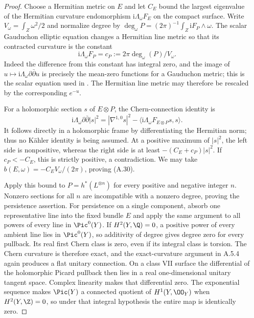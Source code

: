 \begin{proof}
Choose a Hermitian metric on $E$ and let $C_E$ bound the largest eigenvalue of the Hermitian curvature endomorphism $\mathrm i\Lambda_\omega F_E$ on the compact surface. Write $V_\omega=\int_Z\omega^2/2$ and normalize degree by
$\deg_\omega P=(2\pi)^{-1}\int_Z\mathrm iF_P\wedge\omega$.
The scalar Gauduchon elliptic equation changes a Hermitian line metric so that its contracted curvature is the constant
\[
 \mathrm i\Lambda_\omega F_P
       =c_P:=2\pi\deg_\omega(P)/V_\omega.
\]
Indeed the difference from this constant has integral zero, and the image of $u\mapsto\mathrm i\Lambda_\omega\partial\bar\partial u$ is precisely the mean-zero functions for a Gauduchon metric; this is the scalar equation used in \cite[Lemma~2.3]{Teleman2006}. The Hermitian line metric may therefore be rescaled by the corresponding $e^{-u}$.

For a holomorphic section $s$ of $E\otimes P$, the Chern-connection identity is
\[
 \mathrm i\Lambda_\omega\partial\bar\partial|s|^2
 =|\nabla^{1,0}s|^2
  -\langle\mathrm i\Lambda_\omega F_{E\otimes P}s,s\rangle.
\]
It follows directly in a holomorphic frame by differentiating the Hermitian norm; thus no Kähler identity is being assumed. At a positive maximum of $|s|^2$, the left side is nonpositive, whereas the right side is at least
$-(C_E+c_P)|s|^2$.
If $c_P<-C_E$, this is strictly positive, a contradiction. We may take $b(E,\omega)=-C_EV_\omega/(2\pi)$, proving (A.30).

Apply this bound to $P=h^*(L^{\otimes n})$ for every positive and negative integer $n$. Nonzero sections for all $n$ are incompatible with a nonzero degree, proving the persistence assertion. For persistence on a single component, absorb one representative line into the fixed bundle $E$ and apply the same argument to all powers of every line in $\Pic^0(Y)$. If $H^2(Y,\Q)=0$, a positive power of every ambient line lies in $\Pic^0(Y)$, so additivity of degree gives degree zero for every pullback. Its real first Chern class is zero, even if its integral class is torsion. The Chern curvature is therefore exact, and the exact-curvature argument in A.5.4 again produces a flat unitary connection. On a class VII surface the differential of the holomorphic Picard pullback then lies in a real one-dimensional unitary tangent space. Complex linearity makes that differential zero. The exponential sequence makes $\Pic(Y)$ a connected quotient of $H^1(Y,\OO_Y)$ when $H^2(Y,\Z)=0$, so under that integral hypothesis the entire map is identically zero.
\end{proof}

